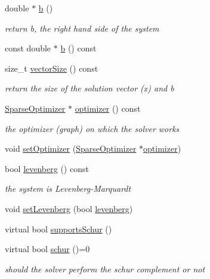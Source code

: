 \begin{DoxyCompactItemize}
double $\ast$ \hyperlink{classg2o_1_1Solver_a3212ad9d80f8f5ad15b72c2b55000095}{b} ()
\begin{DoxyCompactList}\small\item\em return b, the right hand side of the system \end{DoxyCompactList}\item 
const double $\ast$ \hyperlink{classg2o_1_1Solver_a9cae6286a8f4b8b93032097cee6cddf6}{b} () const 
\item 
size\+\_\+t \hyperlink{classg2o_1_1Solver_a739e1e7b0888d5f316f1d68cbd21bc2d}{vector\+Size} () const 
\begin{DoxyCompactList}\small\item\em return the size of the solution vector (x) and b \end{DoxyCompactList}\item 
\hyperlink{classg2o_1_1SparseOptimizer}{Sparse\+Optimizer} $\ast$ \hyperlink{classg2o_1_1Solver_a9ea585f131ab02ae1e0c0192126f0b5f}{optimizer} () const 
\begin{DoxyCompactList}\small\item\em the optimizer (graph) on which the solver works \end{DoxyCompactList}\item 
void \hyperlink{classg2o_1_1Solver_af27b647cdc19d99ea5378b443e118bb0}{set\+Optimizer} (\hyperlink{classg2o_1_1SparseOptimizer}{Sparse\+Optimizer} $\ast$\hyperlink{classg2o_1_1Solver_a9ea585f131ab02ae1e0c0192126f0b5f}{optimizer})
\item 
bool \hyperlink{classg2o_1_1Solver_a074069dacd2ac34c895c6f2f333e38d5}{levenberg} () const 
\begin{DoxyCompactList}\small\item\em the system is Levenberg-\/\+Marquardt \end{DoxyCompactList}\item 
void \hyperlink{classg2o_1_1Solver_a01e21c08d7ec8c8051de565b5c314fa1}{set\+Levenberg} (bool \hyperlink{classg2o_1_1Solver_a074069dacd2ac34c895c6f2f333e38d5}{levenberg})
\item 
virtual bool \hyperlink{classg2o_1_1Solver_a36c68f7bc0b8864ee7722bc3c06de554}{supports\+Schur} ()
\item 
virtual bool \hyperlink{classg2o_1_1Solver_acc8d6a8ae7847a157d4a2f44aea14c74}{schur} ()=0
\begin{DoxyCompactList}\small\item\em should the solver perform the schur complement or not \end{DoxyCompactList}\item 

\end{DoxyCompactItemize}
